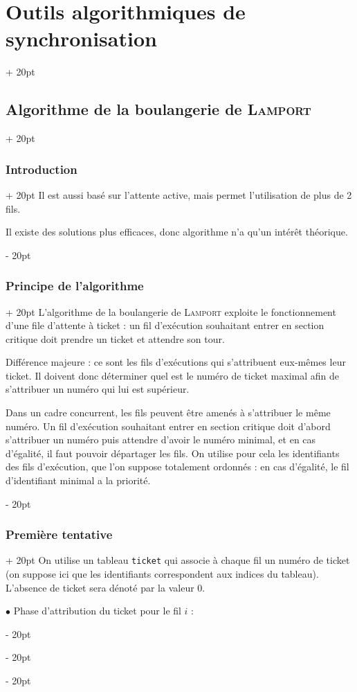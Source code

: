 \documentclass[a4paper, 12pt, twoside]{article}
\newcommand{\ind}[1][20pt]{\advance\leftskip + #1}
\newcommand{\deind}[1][20pt]{\advance\leftskip - #1}
\newenvironment{indt}[2][20pt]{#2 \par \ind[#1]}{\par \deind} %
\begin{document}
\begin{indt}{\section{Outils algorithmiques de synchronisation}}
\begin{indt}{\subsection{Algorithme de la boulangerie de \textsc{Lamport}}}
\begin{indt}{\subsubsection{Introduction}}
                Il est aussi basé sur l'attente active, mais permet l'utilisation de plus de 2 fils.

                Il existe des solutions plus efficaces, donc algorithme n'a qu'un intérêt théorique.
            \end{indt}

            \vspace{12pt}
            
            \begin{indt}{\subsubsection{Principe de l'algorithme}}
                L'algorithme de la boulangerie de \textsc{Lamport} exploite le fonctionnement d'une file d'attente à ticket : un fil d'exécution souhaitant entrer en section critique doit prendre un ticket et attendre son tour.

                Différence majeure : ce sont les fils d'exécutions qui s'attribuent eux-mêmes leur ticket. Il doivent donc déterminer quel est le numéro de ticket maximal afin de s'attribuer un numéro qui lui est supérieur.

                Dans un cadre concurrent, les fils peuvent être amenés à s'attribuer le même numéro.
                Un fil d'exécution souhaitant entrer en section critique doit d'abord s'attribuer un numéro puis attendre d'avoir le numéro minimal, et en cas d'égalité, il faut pouvoir départager les fils.
                On utilise pour cela les identifiants des fils d'exécution, que l'on suppose totalement ordonnés : en cas d'égalité, le fil d'identifiant minimal a la priorité.
            \end{indt}

            \vspace{12pt}
            
            \begin{indt}{\subsubsection{Première tentative}}
                On utilise un tableau \texttt{ticket} qui associe à chaque fil un numéro de ticket (on suppose ici que les identifiants correspondent aux indices du tableau).
                L'absence de ticket sera dénoté par la valeur 0.

                $\bullet$ Phase d'attribution du ticket pour le fil $i$ :


\end{indt}
\end{indt}
\end{indt}
\end{document}
